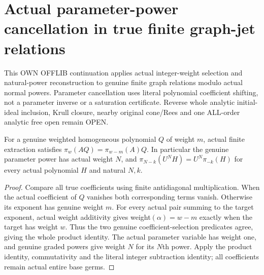 \section{Actual parameter-power cancellation in true finite graph-jet relations}
This OWN OFFLIB continuation applies actual integer-weight selection and natural-power reconstruction to genuine finite graph relations modulo actual normal powers. Parameter cancellation uses literal polynomial coefficient shifting, not a parameter inverse or a saturation certificate. Reverse whole analytic initial-ideal inclusion, Krull closure, nearby original cone/Rees and one ALL-order analytic free open remain OPEN.

\begin{lemma}
\label{hir:relative-normal-graph-weight-actual-parameter-shift}
\leanok
For a genuine weighted homogeneous polynomial $Q$ of weight $m$, actual finite extraction satisfies $\pi_w(AQ)=\pi_{w-m}(A)Q$. In particular the genuine parameter power has actual weight $N$, and $\pi_{N-k}(U^NH)=U^N\pi_{-k}(H)$ for every actual polynomial $H$ and natural $N,k$.
\end{lemma}
\begin{proof}
Compare all true coefficients using finite antidiagonal multiplication. When the actual coefficient of $Q$ vanishes both corresponding terms vanish. Otherwise its exponent has genuine weight $m$. For every actual pair summing to the target exponent, actual weight additivity gives weight$(\alpha)=w-m$ exactly when the target has weight $w$. Thus the two genuine coefficient-selection predicates agree, giving the whole product identity. The actual parameter variable has weight one, and genuine graded powers give weight $N$ for its $N$th power. Apply the product identity, commutativity and the literal integer subtraction identity; all coefficients remain actual entire base germs.
\end{proof}

